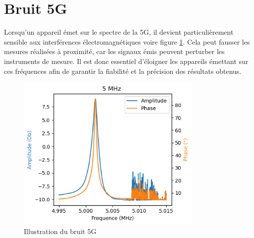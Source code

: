 \section{Bruit 5G}

Lorsqu'un appareil émet sur le spectre de la 5G, il devient particulièrement sensible aux interférences électromagnétiques voire figure \ref{fig:bruit-5g}. Cela peut fausser les mesures réalisées à proximité, car les signaux émis peuvent perturber les instruments de mesure. Il est donc essentiel d'éloigner les appareils émettant sur ces fréquences afin de garantir la fiabilité et la précision des résultats obtenus.
\begin{figure}[H]
    \centering
    \includegraphics[width=0.8\textwidth]{assets/figures/bruit5G.png}
    \caption{Illustration du bruit 5G}
    \label{fig:bruit-5g}
\end{figure}
